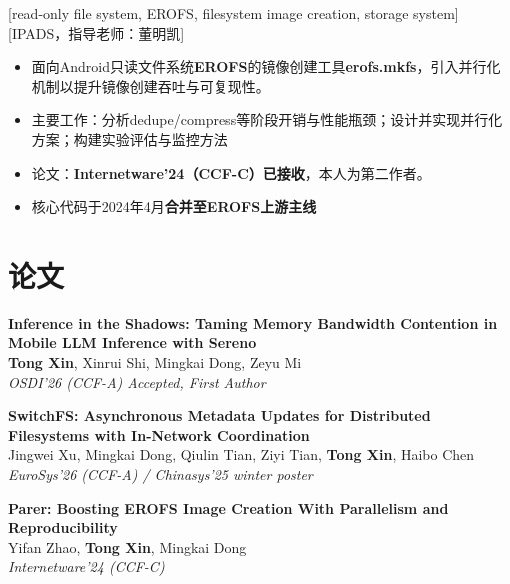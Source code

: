 \documentclass{chicv}
\begin{document}
[read-only file system, EROFS, filesystem image creation, storage system]
[IPADS，指导老师：董明凯]
\begin{itemize}
  \item 面向Android只读文件系统\textbf{EROFS}的镜像创建工具\textbf{erofs.mkfs}，引入并行化机制以提升镜像创建吞吐与可复现性。
  \item 主要工作：分析dedupe/compress等阶段开销与性能瓶颈；设计并实现并行化方案；构建实验评估与监控方法
  \item 论文：\textbf{Internetware'24（CCF-C）已接收}，本人为第二作者。
  \item 核心代码于2024年4月\textbf{合并至EROFS上游主线}
\end{itemize}

\section{论文}

\begin{enumerate}[label={[\arabic*]}, leftmargin=32pt, itemsep=4pt]
  \item \textbf{Inference in the Shadows: Taming Memory Bandwidth Contention in Mobile LLM Inference with Sereno} \\
  \textbf{Tong Xin}, Xinrui Shi, Mingkai Dong, Zeyu Mi \\
  \textit{OSDI'26 (CCF-A) Accepted, First Author}

  \item \textbf{SwitchFS: Asynchronous Metadata Updates for Distributed Filesystems with In-Network Coordination} \\
  Jingwei Xu, Mingkai Dong, Qiulin Tian, Ziyi Tian, \textbf{Tong Xin}, Haibo Chen \\
  \textit{EuroSys'26 (CCF-A) / Chinasys'25 winter poster}

  \item \textbf{Parer: Boosting EROFS Image Creation With Parallelism and Reproducibility} \\
  Yifan Zhao, \textbf{Tong Xin}, Mingkai Dong \\
  \textit{Internetware'24 (CCF-C)}
\end{enumerate}
\end{document}
